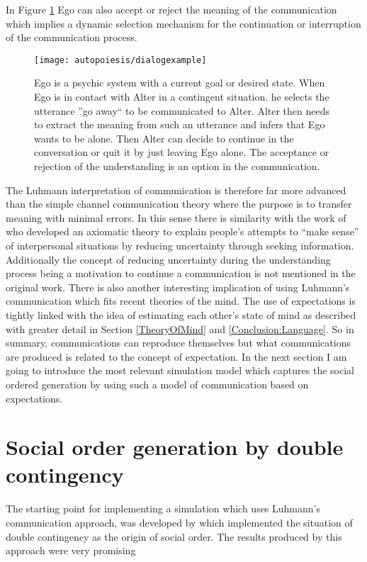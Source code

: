 In Figure \ref{Fig:Autopoiesis:CommExample} Ego can also accept or reject the
meaning of the communication which implies a dynamic selection mechanism for
the continuation or interruption of the communication process.

\begin{figure}[htbp]
\begin{center}
\texttt{[image: autopoiesis/dialogexample]}
\end{center}
\small{
\caption[Communication between alter and ego]{
Ego is a psychic system with a current goal or desired state.
When Ego is in contact with Alter in a contingent situation. he selects the utterance 
''go away`` to be communicated to Alter. Alter then needs to extract the 
meaning from such an utterance and infers that Ego wants to be alone. 
Then Alter can decide to continue in the conversation or quit it by just leaving
 Ego alone.
The acceptance or rejection of the understanding is an option in the communication.
\label{Fig:Autopoiesis:CommExample}}}
\end{figure}

The Luhmann interpretation of communication is therefore far more advanced
than the simple channel communication theory where the purpose is to transfer
meaning with minimal errors.
In this sense there is similarity with the work of \citep{Berger1975:URT} 
who developed an axiomatic theory to explain people's attempts to “make sense” of interpersonal
situations by reducing uncertainty through seeking information.
Additionally the concept of reducing uncertainty
during the understanding process being a motivation to continue a communication 
is not mentioned in the original work.
There is also another interesting implication of using Luhmann's communication 
which fits recent theories of the mind.
The use of expectations is tightly linked with the idea of estimating each other's
state of mind as described with greater detail in Section \ref{TheoryOfMind} and \ref{Conclusion:Language}.
So in summary, communications can reproduce themselves but what communications
are produced is related to the concept of expectation.
In the next section I am going to introduce the most relevant simulation model 
which captures the social ordered generation by using such a model of communication 
based on expectations.

\section{Social order generation by double contingency}
\label{Introduction:SocialOrderModel}
The starting point for implementing a simulation which uses Luhmann's communication approach, 
was developed by \citet{SocialOrderScalability} which implemented the situation of
double contingency as the origin of social order.
The results produced by this approach were very promising


